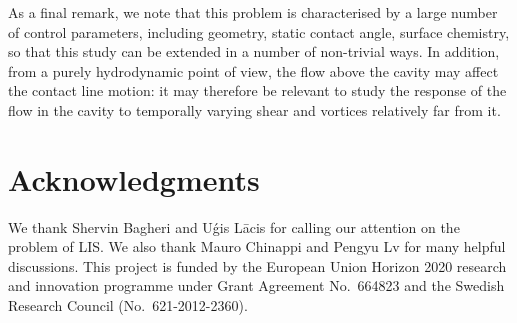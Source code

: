 
As a final remark, we note that this problem is characterised by a large number of control parameters, including \eg geometry, static contact angle, surface chemistry, so that this study can be extended in a number of non-trivial ways. In addition, from a purely hydrodynamic point of view, the flow above the cavity may affect the contact line motion: it may therefore be relevant to study the response of the flow in the cavity to temporally varying shear and vortices relatively far from it.

\section*{Acknowledgments}

We thank Shervin Bagheri and U\'{g}is L\={a}cis for calling our attention on the problem of LIS. We also thank Mauro Chinappi and Pengyu Lv for many helpful discussions. This project is funded by the European Union Horizon 2020 research and innovation programme under Grant Agreement No.\ 664823 and the Swedish Research Council (No.\ 621-2012-2360).



